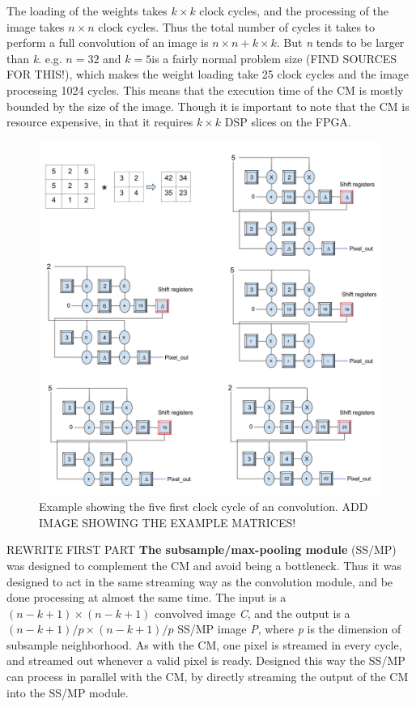 The loading of the weights takes $ k \times k $ clock cycles, and the processing of the image takes $ n \times n $ clock cycles. Thus the total number of cycles it takes to perform a full convolution of an image is $ n \times n + k \times k $. But \textit{n} tends to be larger than \textit{k}. e.g. $ n = 32 $ and $ k = 5 $is a fairly normal problem size (FIND SOURCES FOR THIS!), which makes the weight loading take 25 clock cycles and the image processing 1024 cycles. This means that the execution time of the CM is mostly bounded by the size of the image. Though it is important to note that the CM is resource expensive, in that it requires $ k \times k $ DSP slices on the FPGA.

\begin{figure}[h!]
  \centering
      \includegraphics[width=1.0\textwidth]{Figures/Method/Conv_example}
  \caption{Example showing the five first clock cycle of an convolution. ADD IMAGE SHOWING THE EXAMPLE MATRICES!}
\end{figure}

\vspace*{1\baselineskip}
REWRITE FIRST PART
\textbf{The subsample/max-pooling module} (SS/MP) was designed to complement the CM and avoid being a bottleneck. Thus it was designed to act in the same streaming way as the convolution module, and be done processing at almost the same time. The input is a $ (n-k+1) \times (n-k+1) $ convolved image \textit{C}, and the output is a $ (n-k+1)/p \times (n-k+1)/p $ SS/MP image \textit{P}, where \textit{p} is the dimension of subsample neighborhood. As with the CM, one pixel is streamed in every cycle, and streamed out whenever a valid pixel is ready. Designed this way the SS/MP can process in parallel with the CM, by directly streaming the output of the CM into the SS/MP module. 

